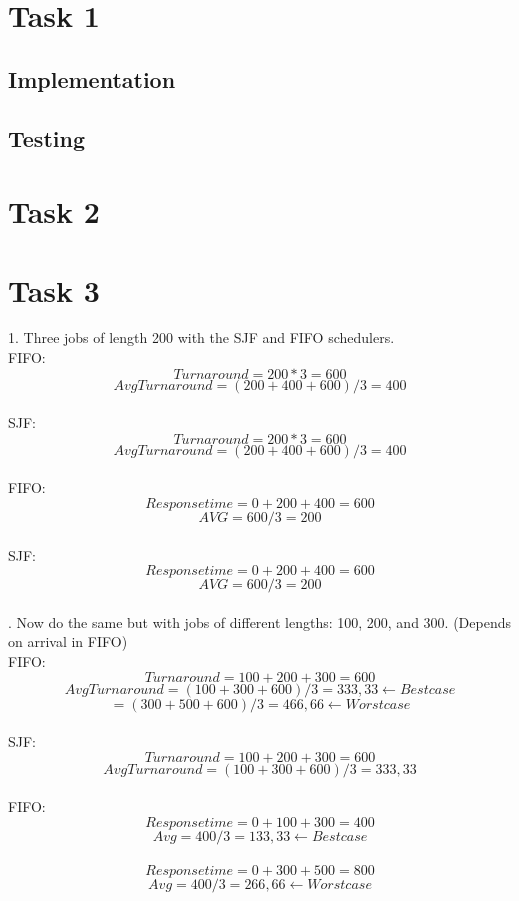 \documentclass[12pt]{article}
\begin{document}
\section*{Task 1}
\subsection*{Implementation}

\subsection*{Testing}

\section*{Task 2}


\section*{Task 3}
1. Three jobs of length 200 with the SJF and FIFO schedulers.\\

\noindent FIFO:
$$Turnaround = 200 * 3 = 600$$ $$AvgTurnaround = (200 + 400 + 600) / 3 = 400$$\\
\noindent SJF:
$$Turnaround = 200 * 3 = 600$$     $$AvgTurnaround = (200 + 400 + 600) / 3 = 400$$\\

\noindent FIFO:
$$Response time = 0 + 200 + 400 = 600$$     $$AVG = 600/3 = 200$$\\
\noindent SJF:
$$Response time = 0 + 200 + 400 = 600$$     $$AVG = 600/3 = 200$$\\

. Now do the same but with jobs of different lengths: 100, 200, and 300.      (Depends on arrival in FIFO)\\

\noindent FIFO: 
$$Turnaround = 100 + 200 + 300 = 600$$     $$AvgTurnaround = (100 + 300 + 600) / 3 = 333,33     \leftarrow Best case$$
							   $$= (300 + 500 + 600) / 3 = 466,66     \leftarrow Worst case$$\\

\noindent SJF:
$$Turnaround = 100 + 200 + 300 = 600$$     $$AvgTurnaround = (100 + 300 + 600) / 3 = 333,33$$\\

\noindent FIFO: 
$$Response time = 0 + 100 + 300 = 400$$    $$Avg = 400/3 = 	133,33     \leftarrow Best case$$\\
      $$Response time = 0 + 300 + 500 = 800$$    $$Avg = 400/3 = 	266,66     \leftarrow Worst case$$\\
							   
\end{document}
